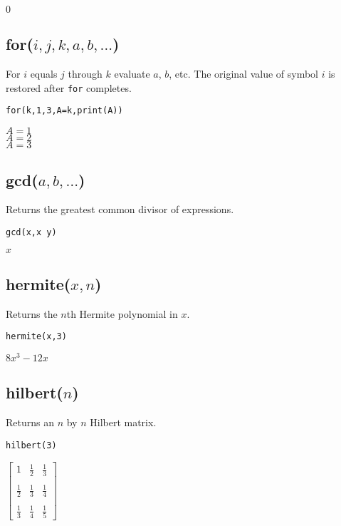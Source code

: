 \noindent
$0$

\subsection*{for($i,j,k,a,b,\ldots$)}

For $i$ equals $j$ through $k$ evaluate $a$, $b$, etc.
The original value of symbol $i$ is restored after {\tt for} completes.

{\color{blue}
\begin{verbatim}
for(k,1,3,A=k,print(A))
\end{verbatim}
}

\noindent
$A=1$\\
$A=2$\\
$A=3$

\subsection*{gcd($a,b,\ldots$)}

Returns the greatest common divisor of expressions.

{\color{blue}
\begin{verbatim}
gcd(x,x y)
\end{verbatim}
}

\noindent
$x$

\subsection*{hermite($x,n$)}

Returns the $n$th Hermite polynomial in $x$.

{\color{blue}
\begin{verbatim}
hermite(x,3)
\end{verbatim}
}

\noindent
$\displaystyle 8x^3-12x$


\subsection*{hilbert($n$)}

Returns an $n$ by $n$ Hilbert matrix.

{\color{blue}
\begin{verbatim}
hilbert(3)
\end{verbatim}
}

\noindent
$\displaystyle
\begin{bmatrix}
1 & \tfrac{1}{2} & \tfrac{1}{3}\\ \\
\tfrac{1}{2} & \tfrac{1}{3} & \tfrac{1}{4}\\ \\
\tfrac{1}{3} & \tfrac{1}{4} & \tfrac{1}{5}
\end{bmatrix}
$

